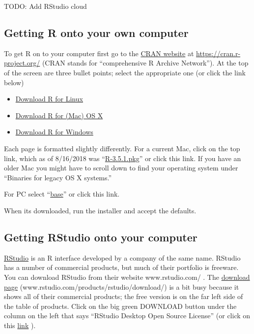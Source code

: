 \documentclass[
]{book}
\providecommand{\tightlist}{%
  \setlength{\itemsep}{0pt}\setlength{\parskip}{0pt}}
\begin{document}
TODO: Add RStudio cloud

\hypertarget{getting-r-onto-your-own-computer}{%
\subsection{Getting R onto your own computer}\label{getting-r-onto-your-own-computer}}

To get R on to your computer first go to the \href{https://cran.r-project.org/}{CRAN website} at \url{https://cran.r-project.org/} (CRAN stands for ``comprehensive R Archive Network''). At the top of the screen are three bullet points; select the appropriate one (or click the link below)

\begin{itemize}
\tightlist
\item
  \href{https://cran.r-project.org/bin/linux/}{Download R for Linux}
\item
  \href{https://cran.r-project.org/bin/macosx/}{Download R for (Mac) OS X}
\item
  \href{https://cran.r-project.org/bin/windows/}{Download R for Windows}
\end{itemize}

Each page is formatted slightly differently. For a current Mac, click on the top link, which as of 8/16/2018 was ``\href{https://cran.r-project.org/bin/macosx/R-3.5.1.pkg}{R-3.5.1.pkg}'' or click this link. If you have an older Mac you might have to scroll down to find your operating system under ``Binaries for legacy OS X systems.''

For PC select ``\href{https://cran.r-project.org/bin/windows/base/}{base}'' or click this link.

When its downloaded, run the installer and accept the defaults.

\hypertarget{getting-rstudio-onto-your-computer}{%
\subsection{Getting RStudio onto your computer}\label{getting-rstudio-onto-your-computer}}

\href{www.rstudio.com/}{RStudio} is an R interface developed by a company of the same name. RStudio has a number of commercial products, but much of their portfolio is freeware. You can download RStudio from their website www.rstudio.com/ . The \href{https://www.rstudio.com/products/rstudio/download/}{download page} (www.rstudio.com/products/rstudio/download/) is a bit busy because it shows all of their commercial products; the free version is on the far left side of the table of products. Click on the big green DOWNLOAD button under the column on the left that says ``RStudio Desktop Open Source License'' (or click on this \href{https://www.rstudio.com/products/rstudio/download/\#download}{link} ).
\end{document}
